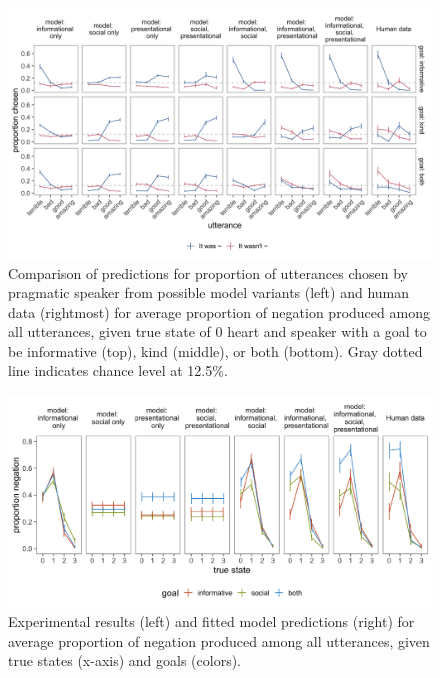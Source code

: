 \documentclass[oneside]{report}
\begin{document}
\begin{figure}[!h]

{\centering \includegraphics[width=\textwidth]{erica_yoon_dissertation_files/figure-latex/comparisonAllPlacement-1} 

}

\caption[Full comparison of model variants for all experimental conditions.]{Comparison of predictions for proportion of utterances chosen by pragmatic speaker from possible model variants (left) and human data (rightmost) for average proportion of negation produced among all utterances, given true state of 0 heart and speaker with a goal to be informative (top), kind (middle), or both (bottom). Gray dotted line indicates chance level at 12.5\%.}\label{fig:comparisonAllPlacement}
\end{figure}
\begin{figure}[!h]

{\centering \includegraphics[width=\textwidth]{erica_yoon_dissertation_files/figure-latex/negationPlacement-1} 

}

\caption[Comparison of experimental results and model predictions for expected proportion of negation.]{Experimental results (left) and fitted model predictions (right) for average proportion of negation produced among all utterances, given true states (x-axis) and goals (colors).}\label{fig:negationPlacement}
\end{figure}
\end{document}
